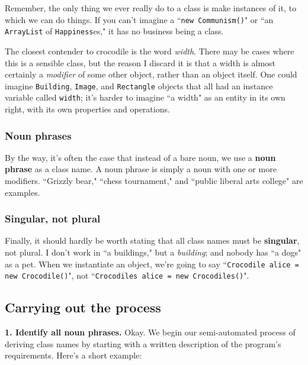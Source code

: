 Remember, the only thing we ever really do to a class is make instances of it,
to which we can do things. If you can't imagine a ``\texttt{new Communism()}"
or ``an \texttt{ArrayList} of \texttt{Happiness}es," it has no business being
a class.

The closest contender to crocodile is the word \textit{width}. There may be
cases where this is a sensible class, but the reason I discard it is that a
width is almost certainly a \textit{modifier} of some other object, rather
than an object itself. One could imagine \texttt{Building}, \texttt{Image},
and \texttt{Rectangle} objects that all had an instance variable called
\texttt{width}; it's harder to imagine ``a width" as an entity in its own
right, with its own properties and operations.

\subsubsection{Noun phrases}

By the way, it's often the case that instead of a bare noun, we use a
\textbf{noun phrase} as a class name. A noun phrase is simply a noun with one
or more modifiers. ``Grizzly bear," ``chess tournament," and ``public liberal
arts college" are examples.

\subsubsection{Singular, not plural}

Finally, it should hardly be worth stating that all class names must be
\textbf{singular}, not plural. I don't work in ``a buildings," but a
\textit{building}; and nobody has ``a dogs" as a pet. When we instantiate an
object, we're going to say ``\texttt{Crocodile alice = new Crocodile()}", not 
``\texttt{Crocodiles alice = new Crocodiles()}".

\subsection{Carrying out the process}

\textbf{1. Identify all noun phrases.} Okay. We begin our semi-automated
process of deriving class names by starting with a written description of the
program's requirements. Here's a short example:

\setlength{\fboxsep}{10pt}
\begin{center}
\large
{}
\end{center}

